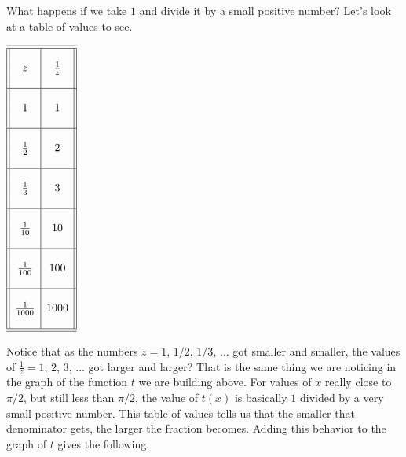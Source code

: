 \documentclass{ximera}
\begin{document}
	What happens if we take $1$ and divide it by a small positive number? Let's look at a table of values to see.
  	\begin{center}
		$\begin{array}{||c|c||}
			\hline 
			\hline
			&  \\
			z & \frac{1}{z}\\ 
			&  \\
			\hline
			&  \\
			1&  1\\
			&  \\
			\hline 
			&  \\
			\frac{1}{2}&2\\
			&  \\
			\hline
			&  \\
			\frac{1}{3}&3\\ 
			&  \\
			\hline
			&  \\
			\frac{1}{10}&10\\ 
			&  \\
			\hline
			&  \\
			\frac{1}{100}&100\\ 
			&  \\
			\hline
			&  \\
			\frac{1}{1000}&1000\\ 
			&  \\
			\hline 
			\hline
		\end{array}$
	\end{center}
	Notice that as the numbers $z=1$, $1/2$, $1/3$, $\ldots$ got smaller and smaller, the values of $\frac{1}{z} = 1$, $2$, $3$, $\ldots$ got larger and 
	larger? That is the same thing we are noticing in the graph of the function $t$ we are building above. For values of $x$ really close to $\pi/2$, but still 
	less than $\pi/2$, the value of $t(x)$ is basically $1$ divided by a very small positive number. This table of values tells us that the smaller that 
	denominator gets, the larger the fraction becomes. Adding this behavior to the graph of $t$ gives the following.
	
	\begin{image}
	\end{image}
	
\end{document}
